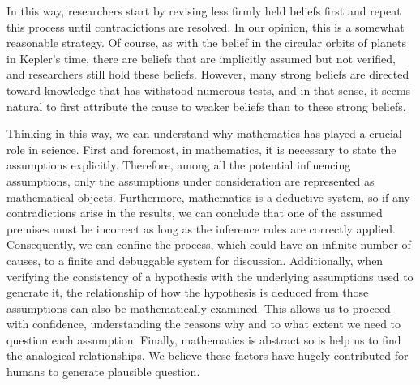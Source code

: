 \documentclass{book}
\begin{document}
In this way, researchers start by revising less firmly held beliefs first and repeat this process until contradictions are resolved. In our opinion, this is a somewhat reasonable strategy. Of course, as with the belief in the circular orbits of planets in Kepler's time, there are beliefs that are implicitly assumed but not verified, and researchers still hold these beliefs. However, many strong beliefs are directed toward knowledge that has withstood numerous tests, and in that sense, it seems natural to first attribute the cause to weaker beliefs than to these strong beliefs.

Thinking in this way, we can understand why mathematics has played a crucial role in science. First and foremost, in mathematics, it is necessary to state the assumptions explicitly. Therefore, among all the potential influencing assumptions, only the assumptions under consideration are represented as mathematical objects. Furthermore, mathematics is a deductive system, so if any contradictions arise in the results, we can conclude that one of the assumed premises must be incorrect as long as the inference rules are correctly applied. Consequently, we can confine the process, which could have an infinite number of causes, to a finite and debuggable system for discussion. Additionally, when verifying the consistency of a hypothesis with the underlying assumptions used to generate it, the relationship of how the hypothesis is deduced from those assumptions can also be mathematically examined. This allows us to proceed with confidence, understanding the reasons why and to what extent we need to question each assumption. Finally, mathematics is abstract so is help us to find the analogical relationships. We believe these factors have hugely contributed for humans to generate plausible question.



\end{document}
